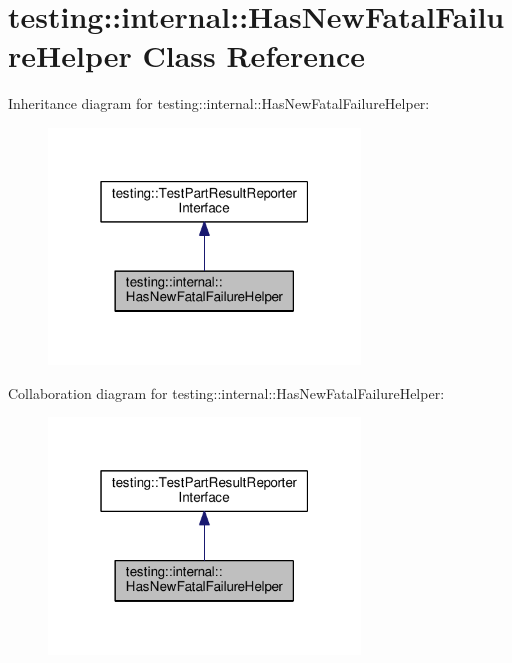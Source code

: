 \hypertarget{classtesting_1_1internal_1_1HasNewFatalFailureHelper}{}\section{testing\+:\+:internal\+:\+:Has\+New\+Fatal\+Failure\+Helper Class Reference}
\label{classtesting_1_1internal_1_1HasNewFatalFailureHelper}


Inheritance diagram for testing\+:\+:internal\+:\+:Has\+New\+Fatal\+Failure\+Helper\+:\nopagebreak
\begin{figure}[H]
\begin{center}
\leavevmode
\includegraphics[width=235pt]{classtesting_1_1internal_1_1HasNewFatalFailureHelper__inherit__graph}
\end{center}
\end{figure}


Collaboration diagram for testing\+:\+:internal\+:\+:Has\+New\+Fatal\+Failure\+Helper\+:\nopagebreak
\begin{figure}[H]
\begin{center}
\leavevmode
\includegraphics[width=235pt]{classtesting_1_1internal_1_1HasNewFatalFailureHelper__coll__graph}
\end{center}
\end{figure}
